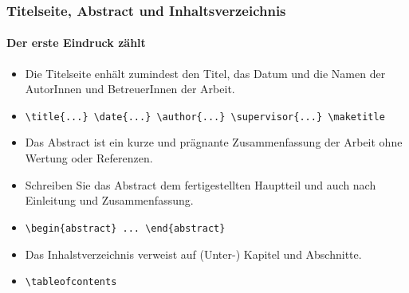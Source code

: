 \begin{frame}
	\frametitle{Titelseite, Abstract und Inhaltsverzeichnis}
	\framesubtitle{Der erste Eindruck zählt}

	\begin{mybox}{}
		\begin{itemize}
			\item Die Titelseite enhält zumindest den Titel, 
			das Datum und die Namen der AutorInnen und BetreuerInnen der Arbeit.
			\item<3-> \texttt{\textbackslash title\{...\} 
				\textbackslash date\{...\} 
				\textbackslash author\{...\}
				\textbackslash supervisor\{...\}
				\textbackslash maketitle}
		\end{itemize}
		
		
	
	\end{mybox}
\bigskip
{}
\begin{mybox}{}
	\begin{itemize}
		\item Das Abstract ist ein kurze und prägnante Zusammenfassung der Arbeit ohne Wertung oder Referenzen.
		\item <5-> Schreiben Sie das Abstract  dem fertigestellten Hauptteil und auch
		nach Einleitung und Zusammenfassung.
		\item <6-> \texttt{\textbackslash begin\{abstract\} ... \textbackslash end\{abstract\}}
	\end{itemize}
	
\end{mybox}
\bigskip
{}
\begin{mybox}{}
	\begin{itemize}
		\item Das Inhalstverzeichnis verweist auf (Unter-) Kapitel und Abschnitte.
		\item<8> \texttt{\textbackslash tableofcontents}
	\end{itemize}
\end{mybox}
\end{frame}

